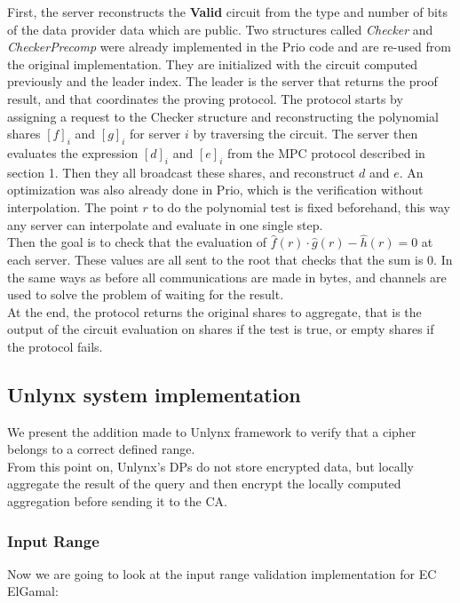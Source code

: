 \documentclass{article}
\begin{document}
First, the server reconstructs the \textbf{Valid} circuit from the type and number of bits of the data provider data which are public.  Two structures called \textit{Checker} and \textit{CheckerPrecomp} were already implemented in the Prio code and are re-used from the original implementation. They are initialized with the circuit computed previously and the leader index. The leader is the server that returns the proof result, and that coordinates the proving protocol.
The protocol starts by assigning a request to the Checker structure and reconstructing the polynomial shares $[f]_i $ and $[g]_i$ for server $i$ by traversing the circuit. The server then evaluates the expression $[d]_i $ and $[e]_i$ from the MPC protocol described in section 1. Then they all broadcast these shares, and reconstruct $d$ and $e$.
An optimization was also already done in Prio, which is the verification without interpolation. The point $r$ to do the polynomial test is fixed beforehand, this way any server can interpolate and evaluate in one single step.\\
Then the goal is to check that the evaluation of $\hat{f}(r) \cdot \hat{g}(r) -\hat{h}(r) = 0$ at each server. These values are all sent to the root that checks that the sum is 0.
In the same ways as before all communications are made in bytes, and channels are used to solve the problem of waiting for the result.\\
At the end, the protocol returns the original shares to aggregate, that is the output of the circuit evaluation on shares  if the test is true, or empty shares if the protocol fails.

\subsection{Unlynx system implementation}
We present the addition made to Unlynx framework to verify that a cipher belongs to a correct defined range.\\
From this point on, Unlynx's DPs do not store encrypted data, but locally aggregate the result of the query and then encrypt the locally computed aggregation before sending it to the CA.

\subsubsection*{Input Range}
Now we are going to look at the input range validation implementation for EC ElGamal:\\
\end{document}
